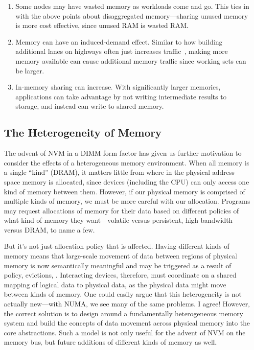 \begin{enumerate}
    \item Some nodes may have wasted memory as workloads come and go. This ties in with the above points about
          disaggregated memory---sharing unused memory is more cost effective, since unused RAM is wasted RAM.
    \item Memory can have an induced-demand effect. Similar to how building additional lanes on highways often just increases
          traffic~\cite{traffic}, making more memory available can cause additional memory traffic since working sets can be larger.
    \item In-memory sharing can increase. With significantly larger memories, applications can take advantage by not
          writing intermediate results to storage, and instead can write to shared memory.
\end{enumerate}

\subsection{The Heterogeneity of Memory}

The advent of NVM in a DIMM form factor has given us further motivation to consider the effects of a heterogeneous
memory environment. When all memory is a single ``kind'' (\eg DRAM), it matters little from where in the physical
address space memory is allocated, since devices (including the CPU) can only access one kind of memory between
them. However, if our physical memory is comprised of multiple kinds of memory, we must be more careful with
our allocation. Programs may request allocations of memory for their data based on different policies of what kind of
memory they want---volatile versus persistent, high-bandwidth versus DRAM, to name a few.

But it's not just allocation policy that is affected. Having different kinds of memory means that large-scale movement
of data between regions of physical memory is now semantically meaningful and may be triggered as a result of policy,
evictions, \etc. Interacting devices, therefore, must coordinate on a shared mapping of logical data to physical data,
as the physical data might move between kinds of memory. One could easily argue that this heterogeneity is not actually
new---with NUMA, we see many of the same problems. I agree! However, the correct solution is to design around a
fundamentally heterogeneous memory system and build the concepts of data movement across physical
memory into the core abstractions. Such a model is not only useful for the advent of NVM on the memory bus, but future additions of different kinds
of memory as well.

